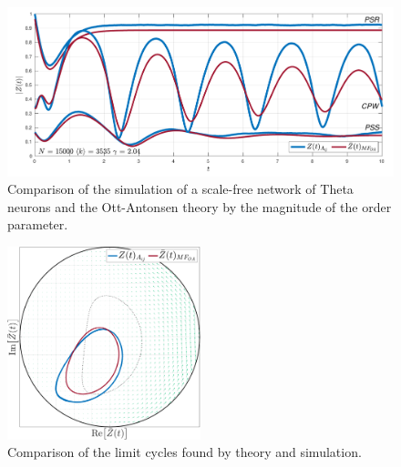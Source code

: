 \begin{figure}[H]
\centering
\includegraphics[width = \textwidth]{../Figures/InspectMeanFieldScaleFree.pdf}
\caption{Comparison of the simulation of a scale-free network of Theta neurons and the Ott-Antonsen theory by the magnitude of the order parameter.}
\label{fig:InspectMeanFieldScaleFree}
\end{figure}

\begin{figure}[H]
\centering
\includegraphics[width = 0.5\textwidth]{../Figures/PhaseSpace/ScalefreeLimCycles.pdf}
\caption{Comparison of the limit cycles found by theory and simulation.}
\label{fig:InspectMeanFieldScaleFreePhaseSpace}
\end{figure}


